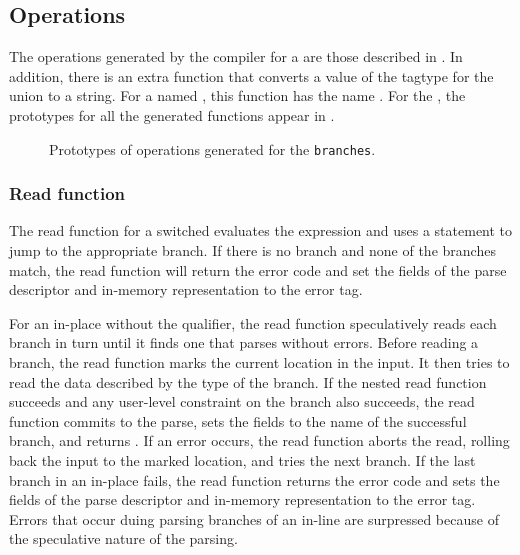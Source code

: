 \subsection{Operations}
The operations generated by the \pads{} compiler for a \Punion{} are
those described in .  In addition, there
is an extra function that converts a value of the tagtype for the
union to a string.  For a \Punion{} named , this function
has the name .  
For the \Punion{}
, the prototypes for all the generated functions appear in
.
\begin{figure}

\caption{Prototypes of operations generated for
  the \Punion{} \texttt{branches}.}
\label{fig:punion-ops}
\end{figure}



\subsubsection{Read function}
The read function for a switched \Punion{} evaluates the \Pswitch{}
expression and uses a \C{}  statement to jump to the
appropriate branch.  If there is no \Pdefault{} branch and none of the
\Pcase{} branches match,  the read function will return the error code
 and set the  fields of the parse
descriptor and in-memory representation to the error tag. 

For an in-place \Punion{} without the \Plongest{} qualifier, the read
function speculatively reads each 
branch in turn until it finds one that parses without errors.  Before
reading a branch, the read function marks the 
current location in the input.  It then tries to read the data
described by the type of the branch.  If the nested read function
succeeds and any user-level constraint on the branch also succeeds,
the read function commits to the parse, sets the  fields to
the name of the successful branch, and returns
. If an error occurs, the read function aborts the
read, rolling back the input to the marked location, and tries the next
branch.  If the last branch in an in-place \Punion{} fails, the read
function returns the error code
 and sets the  fields of the parse
descriptor and in-memory representation to the error tag. 
Errors that occur duing parsing branches of an in-line \Punion{} are
surpressed because of the speculative nature of the parsing.


